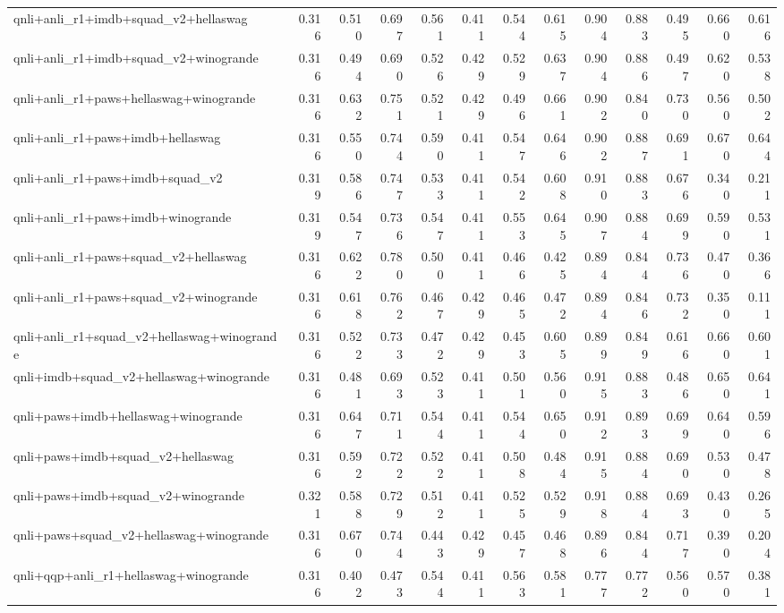 \begin{table}[t]
\begin{tabular}{lrrrrrrrrrrrr}
    qnli+anli\_r1+imdb+squad\_v2+hellaswag & 0.316 & 0.510 & 0.697 & 0.561 & 0.411 & 0.544 & 0.615 & 0.904 & 0.883 & 0.495 & 0.660 & 0.616 \\
    qnli+anli\_r1+imdb+squad\_v2+winogrande & 0.316 & 0.494 & 0.690 & 0.526 & 0.429 & 0.529 & 0.637 & 0.904 & 0.886 & 0.497 & 0.620 & 0.538 \\
    qnli+anli\_r1+paws+hellaswag+winogrande & 0.316 & 0.632 & 0.751 & 0.521 & 0.429 & 0.496 & 0.661 & 0.902 & 0.840 & 0.730 & 0.560 & 0.502 \\
    qnli+anli\_r1+paws+imdb+hellaswag & 0.316 & 0.550 & 0.744 & 0.590 & 0.411 & 0.547 & 0.646 & 0.902 & 0.887 & 0.691 & 0.670 & 0.644 \\
    qnli+anli\_r1+paws+imdb+squad\_v2 & 0.319 & 0.586 & 0.747 & 0.533 & 0.411 & 0.542 & 0.608 & 0.910 & 0.883 & 0.676 & 0.340 & 0.211 \\
    qnli+anli\_r1+paws+imdb+winogrande & 0.319 & 0.547 & 0.736 & 0.547 & 0.411 & 0.553 & 0.645 & 0.907 & 0.884 & 0.699 & 0.590 & 0.531 \\
    qnli+anli\_r1+paws+squad\_v2+hellaswag & 0.316 & 0.622 & 0.780 & 0.500 & 0.411 & 0.466 & 0.425 & 0.894 & 0.844 & 0.736 & 0.470 & 0.366 \\
    qnli+anli\_r1+paws+squad\_v2+winogrande & 0.316 & 0.618 & 0.762 & 0.467 & 0.429 & 0.465 & 0.472 & 0.894 & 0.846 & 0.732 & 0.350 & 0.111 \\
    qnli+anli\_r1+squad\_v2+hellaswag+winogrande & 0.316 & 0.522 & 0.733 & 0.472 & 0.429 & 0.453 & 0.605 & 0.899 & 0.849 & 0.616 & 0.660 & 0.601 \\
    qnli+imdb+squad\_v2+hellaswag+winogrande & 0.316 & 0.481 & 0.693 & 0.523 & 0.411 & 0.501 & 0.560 & 0.915 & 0.883 & 0.486 & 0.650 & 0.641 \\
    qnli+paws+imdb+hellaswag+winogrande & 0.316 & 0.647 & 0.711 & 0.544 & 0.411 & 0.544 & 0.650 & 0.912 & 0.893 & 0.699 & 0.640 & 0.596 \\
    qnli+paws+imdb+squad\_v2+hellaswag & 0.316 & 0.592 & 0.722 & 0.522 & 0.411 & 0.508 & 0.484 & 0.915 & 0.884 & 0.690 & 0.530 & 0.478 \\
    qnli+paws+imdb+squad\_v2+winogrande & 0.321 & 0.588 & 0.729 & 0.512 & 0.411 & 0.525 & 0.529 & 0.918 & 0.884 & 0.693 & 0.430 & 0.265 \\
    qnli+paws+squad\_v2+hellaswag+winogrande & 0.316 & 0.670 & 0.744 & 0.443 & 0.429 & 0.457 & 0.468 & 0.896 & 0.844 & 0.717 & 0.390 & 0.204 \\
    qnli+qqp+anli\_r1+hellaswag+winogrande & 0.316 & 0.402 & 0.473 & 0.544 & 0.411 & 0.563 & 0.581 & 0.777 & 0.772 & 0.560 & 0.570 & 0.381 \\

\end{tabular}
\end{table}

